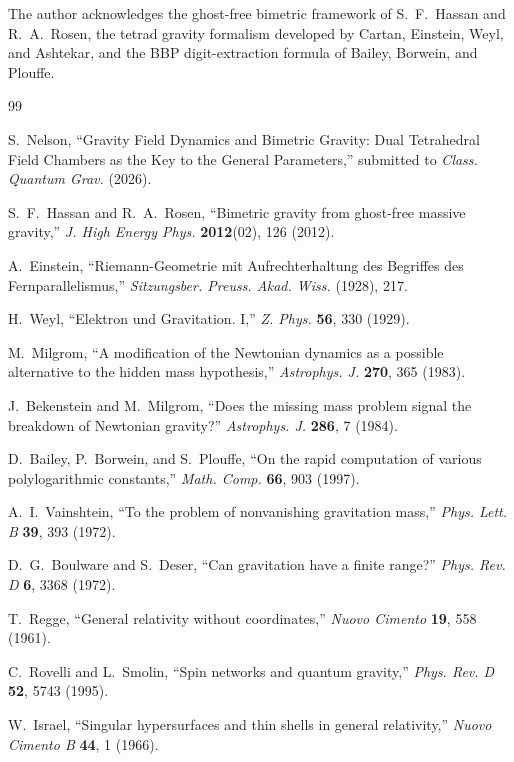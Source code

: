 \documentclass[twocolumn]{iopjournal}
\begin{document}
The author acknowledges the ghost-free bimetric framework of S.~F.~Hassan and R.~A.~Rosen, the tetrad gravity formalism developed by Cartan, Einstein, Weyl, and Ashtekar, and the BBP digit-extraction formula of Bailey, Borwein, and Plouffe.


\begin{thebibliography}{99}

S.~Nelson,
``Gravity Field Dynamics and Bimetric Gravity: Dual Tetrahedral Field Chambers as the Key to the General Parameters,''
submitted to \textit{Class. Quantum Grav.} (2026).

S.~F.~Hassan and R.~A.~Rosen,
``Bimetric gravity from ghost-free massive gravity,''
\textit{J. High Energy Phys.} \textbf{2012}(02), 126 (2012).

A.~Einstein,
``Riemann-Geometrie mit Aufrechterhaltung des Begriffes des Fernparallelismus,''
\textit{Sitzungsber. Preuss. Akad. Wiss.} (1928), 217.

H.~Weyl,
``Elektron und Gravitation. I,''
\textit{Z. Phys.} \textbf{56}, 330 (1929).

M.~Milgrom,
``A modification of the Newtonian dynamics as a possible alternative to the hidden mass hypothesis,''
\textit{Astrophys. J.} \textbf{270}, 365 (1983).

J.~Bekenstein and M.~Milgrom,
``Does the missing mass problem signal the breakdown of Newtonian gravity?''
\textit{Astrophys. J.} \textbf{286}, 7 (1984).

D.~Bailey, P.~Borwein, and S.~Plouffe,
``On the rapid computation of various polylogarithmic constants,''
\textit{Math. Comp.} \textbf{66}, 903 (1997).

A.~I.~Vainshtein,
``To the problem of nonvanishing gravitation mass,''
\textit{Phys. Lett. B} \textbf{39}, 393 (1972).

D.~G.~Boulware and S.~Deser,
``Can gravitation have a finite range?''
\textit{Phys. Rev. D} \textbf{6}, 3368 (1972).

T.~Regge,
``General relativity without coordinates,''
\textit{Nuovo Cimento} \textbf{19}, 558 (1961).

C.~Rovelli and L.~Smolin,
``Spin networks and quantum gravity,''
\textit{Phys. Rev. D} \textbf{52}, 5743 (1995).

W.~Israel,
``Singular hypersurfaces and thin shells in general relativity,''
\textit{Nuovo Cimento B} \textbf{44}, 1 (1966).

\end{thebibliography}
\end{document}
